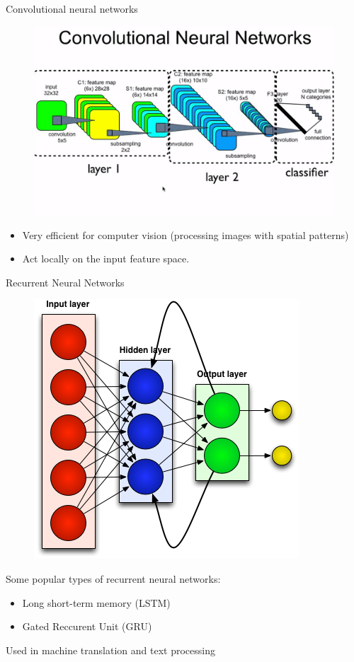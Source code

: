 \documentclass[handout, 10pt]{beamer}
\begin{document}
\begin{frame}{Convolutional neural networks}
    \begin{figure}
        \centering
        \includegraphics[trim=0 100 0 100, clip,width=\textwidth]{fig/L2/CNN.png}
    \end{figure}
    \begin{itemize}
        \item Very efficient for computer vision (processing images with spatial patterns)
        \item Act locally on the input feature space.
    \end{itemize}
\end{frame}
\begin{frame}{Recurrent Neural Networks}
    \begin{figure}
        \centering
        \includegraphics[width=.4\textwidth]{fig/L2/rnn.png}

    \end{figure}

Some popular types of recurrent neural networks:
\begin{itemize}
    \item Long short-term memory (LSTM)
    \item Gated Reccurent Unit (GRU)
\end{itemize}
\alert{Used in machine translation and text processing}
\end{frame}
\end{document}
